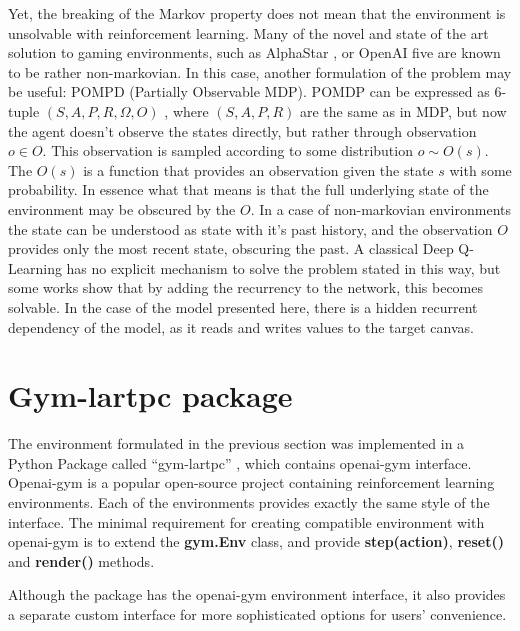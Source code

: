 Yet, the breaking of the Markov property does not mean that the environment is unsolvable with reinforcement learning.
Many of the novel and state of the art solution to gaming environments, such as AlphaStar \cite{Vinyals2019}, or OpenAI five \cite{doi.org/10.48550/arxiv.1912.06680} are known to be rather non-markovian.
In this case, another formulation of the problem may be useful: POMPD (Partially Observable MDP).
POMDP can be expressed as 6-tuple $(S,A,P,R,\Omega,O)$ , where $(S,A,P,R)$ are the same as in MDP, but now the agent doesn't observe the states directly, but rather through observation $o \in O$.
This observation is sampled according to some distribution $o \sim O(s)$. The $O(s)$ is a function that provides an observation given the state $s$ with some probability.
In essence what that means is that the full underlying state of the environment may be obscured by the $O$.
In a case of non-markovian environments the state can be understood as state with it's past history, and the observation $O$ provides only the most recent state, obscuring the past.
A classical Deep Q-Learning has no explicit mechanism to solve the problem stated in this way, but some works \cite{doi.org/10.48550/arxiv.1507.06527} show that by adding the recurrency to the network, this becomes solvable.
In the case of the model presented here, there is a hidden recurrent dependency of the model, as it reads and writes values to the target canvas.

\section{Gym-lartpc package}
The environment formulated in the previous section was implemented in a Python Package called ``gym-lartpc'' \cite{gymlartpc}, which contains openai-gym interface.
Openai-gym \cite{openaigym}is a popular open-source project containing reinforcement learning environments.
Each of the environments provides exactly the same style of the interface.
The minimal requirement for creating compatible environment with openai-gym is to extend the \textbf{gym.Env} class, and provide \textbf{step(action)}, \textbf{reset()} and \textbf{render()} methods.


Although the package has the openai-gym environment interface, it also provides a separate custom interface for more sophisticated options for users' convenience.

